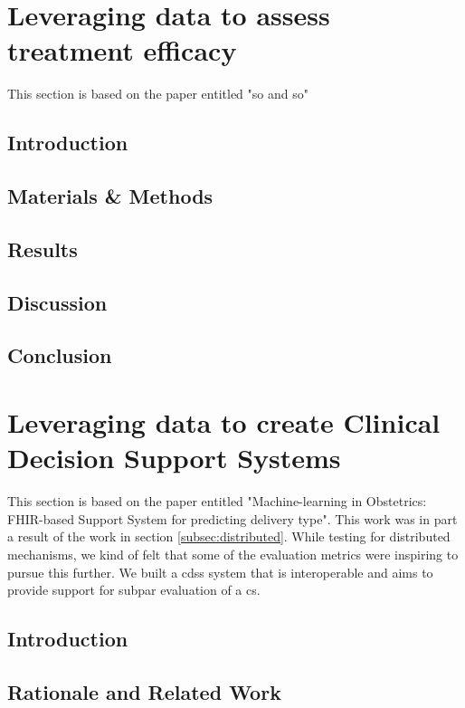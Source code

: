 \section{Leveraging data to assess treatment efficacy}\label{subsec:ipop}
This section is based on the paper entitled "so and so"

\subsection{Introduction}

\subsection{Materials \& Methods}

\subsection{Results}

\subsection{Discussion}

\subsection{Conclusion}





\section{Leveraging data to create Clinical Decision Support Systems}\label{subsec:obs}
This section is based on the paper entitled "Machine-learning in Obstetrics: FHIR-based Support System for predicting delivery type". This work was in part a result of the work in section \ref{subsec:distributed}. While testing for distributed mechanisms, we kind of felt that some of the evaluation metrics were inspiring to pursue this further. We built a \ac{cdss} system that is interoperable and aims to provide support for subpar evaluation of a \ac{cs}.

\subsection{Introduction}

\subsection{Rationale and Related Work}

